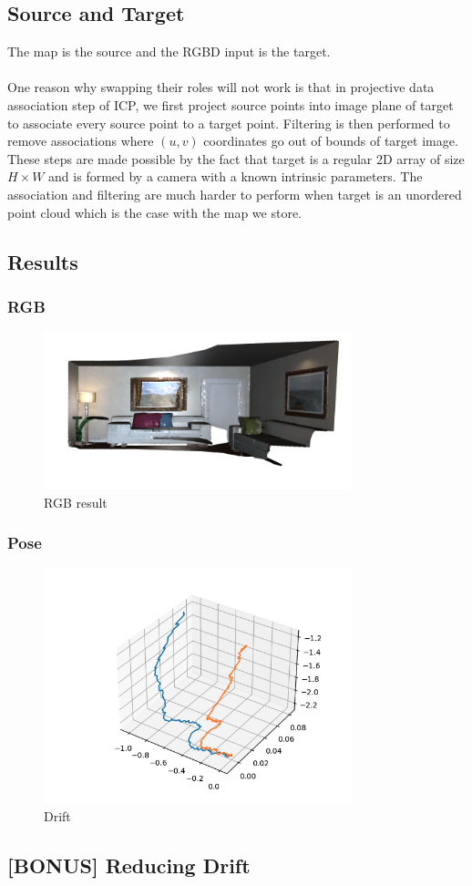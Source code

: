\documentclass[12pt, a4paper]{article}
\begin{document}
\subsection{Source and Target}
The map is the source and the RGBD input is the target.\\\\
One reason why swapping their roles will not work is that in projective data association step of ICP, we first project source points into image plane of target to associate every source point to a target point. Filtering is then performed to remove associations where $(u, v)$ coordinates go out of bounds of target image. These steps are made possible by the fact that target is a regular 2D array of size $H\times W$ and is formed by a camera with a known intrinsic parameters. The association and filtering are much harder to perform when target is an unordered point cloud which is the case with the map we store.
\subsection{Results}
\subsubsection{RGB}
\begin{figure}[H]
  \centering
  \includegraphics[width=0.8\textwidth]{./results/dense_slam/rgb.png}
  \caption{RGB result}
\end{figure}
\subsubsection{Pose}
\begin{figure}[H]
  \centering
  \includegraphics[width=0.8\textwidth]{./results/dense_slam/pose.png}
  \caption{Drift}
\end{figure}
\subsection{[BONUS] Reducing Drift}
\end{document}
